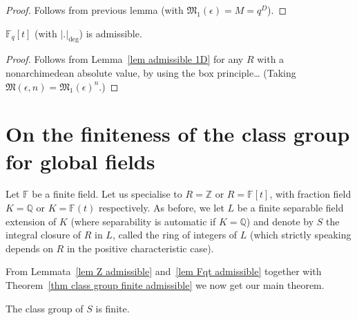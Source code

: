 \documentclass{amsart}
\newcommand{\Z}{\mathbb{Z}}
\newcommand{\Q}{\mathbb{Q}}
\newcommand{\F}{\mathbb{F}}
\newcommand{\M}{\mathfrak{M}}
\begin{document}
\begin{proof}
Follows from previous lemma (with $\M_1(\epsilon)=M=q^D$).
\end{proof}

\begin{lemma}\label{lem Fqt admissible}
$\F_q[t]$ (with $|.|_{\deg}$) is admissible.
\end{lemma}

\begin{proof}
Follows from Lemma~\ref{lem admissible 1D} for any $R$ with a nonarchimedean absolute value, by using the box principle\ldots
(Taking $\M(\epsilon,n)=\M_1(\epsilon)^n$.)
\end{proof}

\section{On the finiteness of the class group for global fields}

Let $\F$ be a finite field. Let us specialise to $R=\Z$ or $R=\F[t]$, with fraction field $K=\Q$ or $K=\F(t)$ respectively. As before, we let $L$ be a finite separable field extension of $K$ (where separability is automatic if $K=\Q$) and denote by $S$ the integral closure of $R$ in $L$, called the ring of integers of $L$ (which strictly speaking depends on $R$ in the positive characteristic case).

From Lemmata~\ref{lem Z admissible} and~\ref{lem Fqt admissible} together with Theorem~\ref{thm class group finite admissible} we now get our main theorem.

\begin{theorem}
The class group of $S$ is finite.
\end{theorem}
\end{document}
